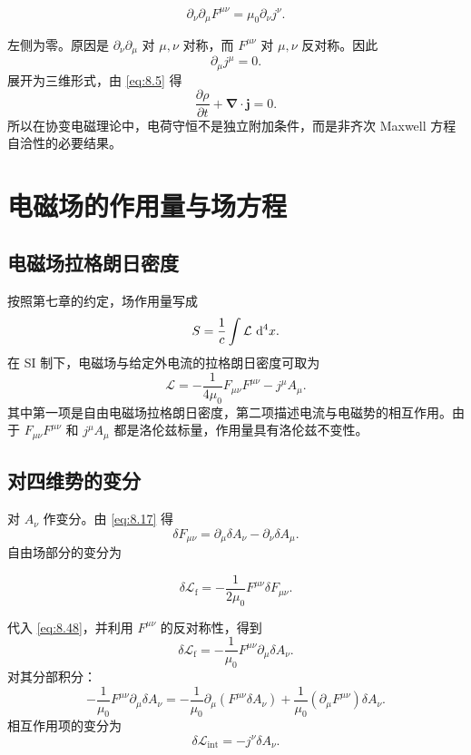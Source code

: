 \[
\partial_{\nu}\partial_{\mu}F^{\mu\nu}
=
\mu_{0}\partial_{\nu}j^{\nu}.
\]

左侧为零。原因是 $\partial_{\nu}\partial_{\mu}$ 对 $\mu,\nu$ 对称，而 $F^{\mu\nu}$ 对 $\mu,\nu$ 反对称。因此
\begin{equation}
	\partial_{\mu}j^{\mu}=0.
	\label{eq:8.44}
\end{equation}
展开为三维形式，由 \eqref{eq:8.5} 得
\begin{equation}
	\frac{\partial\rho}{\partial t}
	+
	\bm{\nabla}\cdot\bm{j}=0.
	\label{eq:8.45}
\end{equation}
所以在协变电磁理论中，电荷守恒不是独立附加条件，而是非齐次 Maxwell 方程自洽性的必要结果。

\section{电磁场的作用量与场方程}

\subsection{电磁场拉格朗日密度}

按照第七章的约定，场作用量写成
\begin{equation}
	S=
	\frac{1}{c}
	\int
	\mathcal{L}\,\mathop{}\!\mathrm{d}^{4}x.
	\label{eq:8.46}
\end{equation}
在 SI 制下，电磁场与给定外电流的拉格朗日密度可取为
\begin{equation}
	\mathcal{L}
	=
	-
	\frac{1}{4\mu_{0}}F_{\mu\nu}F^{\mu\nu}
	-
	j^{\mu}A_{\mu}.
	\label{eq:8.47}
\end{equation}
其中第一项是自由电磁场拉格朗日密度，第二项描述电流与电磁势的相互作用。由于 $F_{\mu\nu}F^{\mu\nu}$ 和 $j^{\mu}A_{\mu}$ 都是洛伦兹标量，作用量具有洛伦兹不变性。

\subsection{对四维势的变分}

对 $A_{\nu}$ 作变分。由 \eqref{eq:8.17} 得
\begin{equation}
	\delta F_{\mu\nu}
	=
	\partial_{\mu}\delta A_{\nu}
	-
	\partial_{\nu}\delta A_{\mu}.
	\label{eq:8.48}
\end{equation}
自由场部分的变分为

\[
\delta\mathcal{L}_{\mathrm{f}}
=
-
\frac{1}{2\mu_{0}}F^{\mu\nu}\delta F_{\mu\nu}.
\]

代入 \eqref{eq:8.48}，并利用 $F^{\mu\nu}$ 的反对称性，得到
\[
\delta\mathcal{L}_{\mathrm{f}}
=
-
\frac{1}{\mu_{0}}F^{\mu\nu}\partial_{\mu}\delta A_{\nu}.
\]
对其分部积分：
\[
-
\frac{1}{\mu_{0}}F^{\mu\nu}\partial_{\mu}\delta A_{\nu}
=
-
\frac{1}{\mu_{0}}\partial_{\mu}(F^{\mu\nu}\delta A_{\nu})
+
\frac{1}{\mu_{0}}(\partial_{\mu}F^{\mu\nu})\delta A_{\nu}.
\]
相互作用项的变分为
\[
\delta\mathcal{L}_{\mathrm{int}}
=
-j^{\nu}\delta A_{\nu}.
\]

